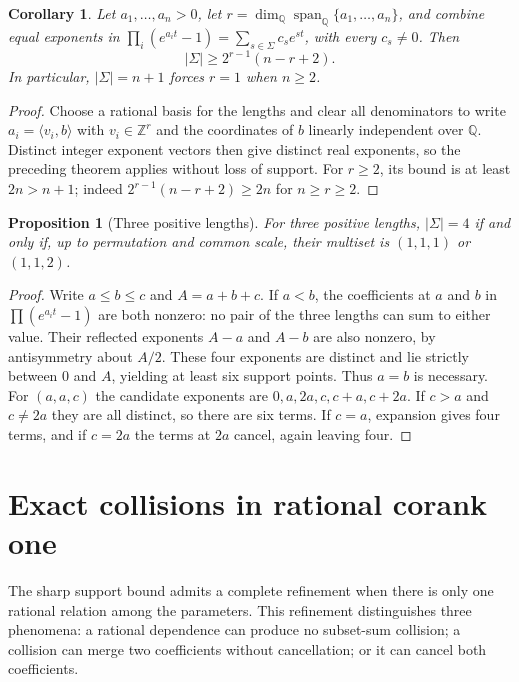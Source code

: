 \documentclass[11pt]{article}
\newtheorem{proposition}[theorem]{Proposition}
\newtheorem{corollary}[theorem]{Corollary}
\theoremstyle{definition}
\theoremstyle{remark}
\numberwithin{equation}{section}
\begin{document}
\begin{corollary}\label{cor:real-length-rank}
Let $a_1,\ldots,a_n>0$, let
$r=\dim_{\mathbb Q}\operatorname{span}_{\mathbb Q}\{a_1,\ldots,a_n\}$,
and combine equal exponents in
$\prod_i(e^{a_it}-1)=\sum_{s\in\Sigma}c_s e^{st}$, with every
$c_s\ne0$. Then
\[
 |\Sigma|\ge2^{r-1}(n-r+2).
\]
In particular, $|\Sigma|=n+1$ forces $r=1$ when $n\ge2$.
\end{corollary}

\begin{proof}
Choose a rational basis for the lengths and clear all denominators to
write $a_i=\langle v_i,b\rangle$ with $v_i\in\mathbb Z^r$ and the
coordinates of $b$ linearly independent over $\mathbb Q$. Distinct
integer exponent vectors then give distinct real exponents, so the
preceding theorem applies without loss of support. For $r\ge2$, its
bound is at least $2n>n+1$; indeed
$2^{r-1}(n-r+2)\ge2n$ for $n\ge r\ge2$.
\end{proof}

\begin{proposition}[Three positive lengths]\label{prop:three-lengths}
For three positive lengths, $|\Sigma|=4$ if and only if, up to
permutation and common scale, their multiset is $(1,1,1)$ or $(1,1,2)$.
\end{proposition}

\begin{proof}
Write $a\le b\le c$ and $A=a+b+c$. If $a<b$, the coefficients at
$a$ and $b$ in $\prod(e^{a_it}-1)$ are both nonzero: no pair of the
three lengths can sum to either value. Their reflected exponents
$A-a$ and $A-b$ are also nonzero, by antisymmetry about $A/2$.
These four exponents are distinct and lie strictly between $0$ and
$A$, yielding at least six support points. Thus $a=b$ is necessary.
For $(a,a,c)$ the candidate exponents are
$0,a,2a,c,c+a,c+2a$. If $c>a$ and $c\ne2a$ they are all distinct,
so there are six terms. If $c=a$, expansion gives four terms, and if
$c=2a$ the terms at $2a$ cancel, again leaving four.
\end{proof}



\section{Exact collisions in rational corank one}
\label{sec:corank-one}

The sharp support bound admits a complete refinement when there is only
one rational relation among the parameters. This refinement distinguishes
three phenomena: a rational dependence can produce no subset-sum
collision; a collision can merge two coefficients without cancellation;
or it can cancel both coefficients.
\end{document}
